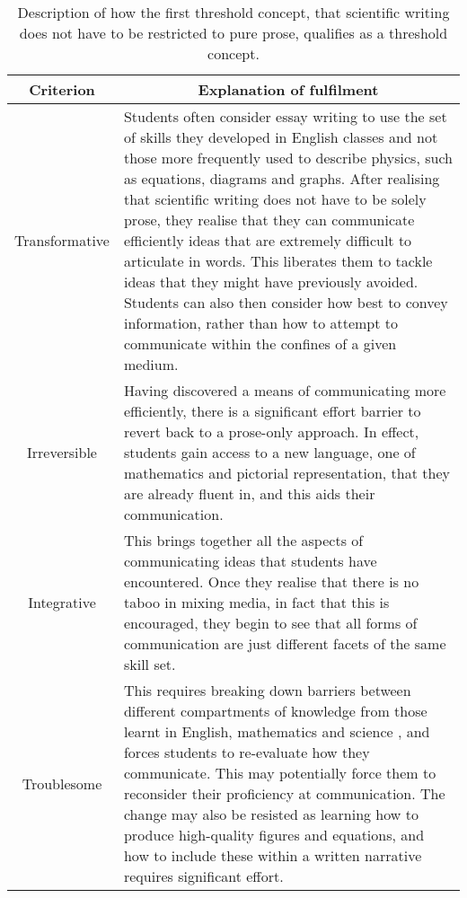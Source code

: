 \begin{table}\scriptsize
\centering
\begin{tabular}{c p{4.5in}}
\toprule
\multicolumn{1}{c}{Criterion} &  \multicolumn{1}{c}{Explanation of fulfilment} \\
\midrule 
\multirow{1}{*}{Transformative}	 & Students often consider essay writing to use the set of skills they developed in English classes and not those more frequently used to describe physics, such as equations, diagrams and graphs. After realising that scientific writing does not have to be solely prose, they realise that they can communicate efficiently ideas that are extremely difficult to articulate in words. This liberates them to tackle ideas that they might have previously avoided. Students can also then consider how best to convey information, rather than how to attempt to communicate within the confines of a given medium. \\
\multirow{1}{*}{Irreversible}	 & Having discovered a means of communicating more efficiently, there is a significant effort barrier to revert back to a prose-only approach. In effect, students gain access to a new language, one of mathematics and pictorial representation, that they are already fluent in, and this aids their communication. \\
\multirow{1}{*}{Integrative}	 & This brings together all the aspects of communicating ideas that students have encountered. Once they realise that there is no taboo in mixing media, in fact that this is encouraged, they begin to see that all forms of communication are just different facets of the same skill set. \\
\multirow{1}{*}{Troublesome}	 & This requires breaking down barriers between different compartments of knowledge from those learnt in English, mathematics and science \citep[cf.][chapter 7]{Kolb1984}, and forces students to re-evaluate how they communicate. This may potentially force them to reconsider their proficiency at communication. The change may also be resisted as learning how to produce high-quality figures and equations, and how to include these within a written narrative requires significant effort. \\
 \bottomrule
\end{tabular}
\caption{Description of how the first threshold concept, that scientific writing does not have to be restricted to pure prose, qualifies as a threshold concept.}\label{tab:words}
\end{table}
